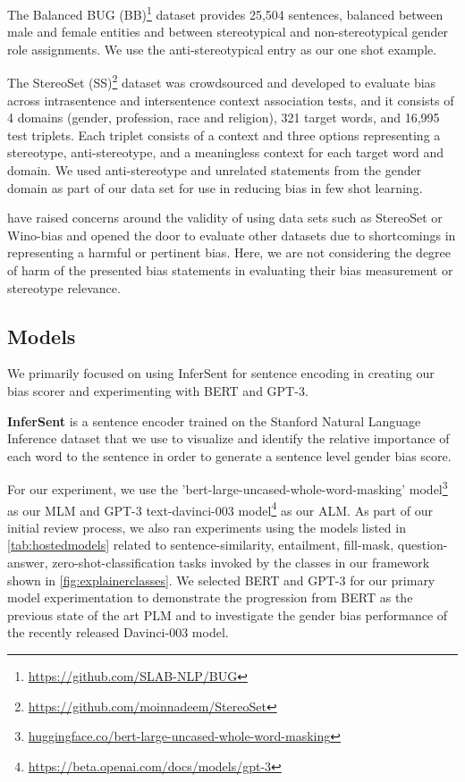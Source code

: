 \documentclass[11pt]{article}
\begin{document}
The Balanced BUG (BB)\footnote{\url{https://github.com/SLAB-NLP/BUG}} dataset provides 25,504 sentences, balanced between male and female entities and between stereotypical and non-stereotypical gender role assignments. We use the anti-stereotypical entry as our one shot example.

The StereoSet (SS)\footnote{\url{https://github.com/moinnadeem/StereoSet}} dataset was crowdsourced and developed to evaluate bias across intrasentence and intersentence context association tests, and it consists of 4 domains (gender,
profession, race and religion), 321 target words, and 16,995 test triplets.  Each triplet consists of a context and three options representing a stereotype, anti-stereotype, and a meaningless context for each  target word and domain. We used anti-stereotype and unrelated statements from the gender domain as part of our data set for use in reducing bias in few shot learning.

\citealt{blodgett-etal-2021-stereotyping:21} have raised concerns around the validity of using data sets such as StereoSet or Wino-bias and opened the door to evaluate other datasets due to shortcomings in representing a harmful or pertinent bias. Here, we are not considering the degree of harm of the presented bias statements in evaluating their bias measurement or stereotype relevance.


\subsection{Models}

We primarily focused on using InferSent for sentence encoding in creating our bias scorer and experimenting with BERT and GPT-3.

\textbf{InferSent} is a sentence encoder trained on the Stanford Natural Language Inference dataset \citep{conneau-EtAl:17} that we use to visualize and identify the relative importance of each word to the sentence in order to generate a sentence level gender bias score.

For our experiment, we use the 'bert-large-uncased-whole-word-masking' model\footnote{\url{huggingface.co/bert-large-uncased-whole-word-masking}} as our MLM and GPT-3 text-davinci-003 model\footnote{\url{https://beta.openai.com/docs/models/gpt-3}} as our ALM. As part of our initial review process, we also ran experiments using the models listed in \autoref{tab:hostedmodels} related to sentence-similarity, entailment, fill-mask, question-answer, zero-shot-classification tasks invoked by the classes in our framework shown in \autoref{fig:explainerclasses}. We selected BERT and GPT-3 for our primary model experimentation to demonstrate the progression from BERT as the previous state of the art PLM and to investigate the gender bias performance of the recently released Davinci-003 model. 
\end{document}
